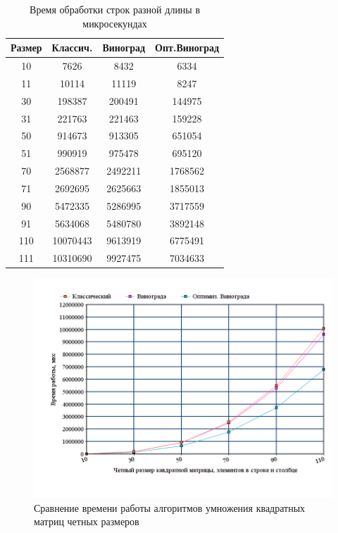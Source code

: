 \documentclass[a4paper,oneside,14pt]{extreport}
\begin{document}
\begin{table}[h]
	\begin{center}
		\captionsetup{justification=raggedleft, singlelinecheck=false}
		\caption{\label{time} Время обработки строк разной длины в микросекундах}
		\begin{tabular}{|c c c c|} 
			\hline
			Размер&Классич.&Виноград&Опт.Виноград\\ [0.5ex]
			\hline
			10 &  7626 &  8432 &  6334\\ 
			\hline
			11 &  10114 &  11119 &  8247\\ 
			\hline
			30 &  198387 &  200491 &  144975\\ 
			\hline
			31 &  221763 &  221463 &  159228\\ 
			\hline
			50 &  914673 &  913305 &  651054\\ 
			\hline
			51 &  990919 &  975478 &  695120\\ 
			\hline
			70 &  2568877 &  2492211 &  1768562\\ 
			\hline
			71 &  2692695 &  2625663 &  1855013\\ 
			\hline
			90 &  5472335 &  5286995 &  3717559\\ 
			\hline
			91 &  5634068 &  5480780 &  3892148\\ 
			\hline
			110 &  10070443 &  9613919 &  6775491\\ 
			\hline
			111 &  10310690 &  9927475 &  7034633\\ 
			\hline
		\end{tabular}
	\end{center}
\end{table}

\begin{figure}[H]
	\centering
	\includegraphics[width=1\linewidth]{images/odd_mat}
	\caption{Сравнение времени работы алгоритмов умножения квадратных матриц четных размеров}
	\label{fig:odd_graph}
\end{figure}
\end{document}
